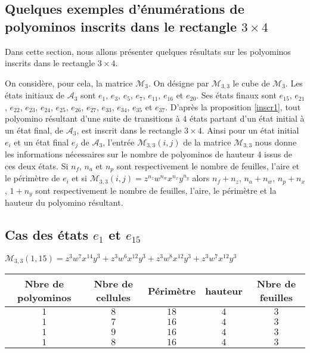 \normalsize
 \begin{spacing}{0.30}
\section*{Quelques exemples d'énumérations de polyominos inscrits dans le rectangle $3 \times 4$ }
 \end{spacing}
Dans  cette section, nous allons présenter quelques résultats sur les polyominos inscrits dans le rectangle $3 \times 4$. 

On considère, pour cela, la matrice $\mathcal{M}_{3}$. On désigne par $\mathcal{M}_{3,3}$ le cube de $\mathcal{M}_{3}$. Les états initiaux de $\mathcal{A}_{3}$ sont $e_{1}$, $e_{3}$, $e_{5}$, $e_{7}$, $e_{11}$, $e_{16}$ et $e_{20}$. Ses états finaux sont $e_{15}$, $e_{21}$, $e_{22}$, $e_{23}$, $e_{24}$, $e_{25}$, $e_{26}$, $e_{27}$, $e_{33}$, $e_{34}$, $e_{35}$ et $e_{37}$. D'après la proposition \ref{inscr1}, tout polyomino résultant d’une suite de transitions à $4$ états partant d’un état initial à un état final, de $\mathcal{A}_{3}$, est inscrit dans le rectangle $3\times 4$. Ainsi pour un état initial $e_{i}$ et un état final $e_{j}$ de $\mathcal{A}_{3}$, l'entrée $\mathcal{M}_{3,3}(i,j)$ de la matrice $\mathcal{M}_{3,3}$ nous donne les informations nécessaires sur le nombre de polyominos de hauteur $4$ issus de ces deux états. Si $n_{f}$, $n_{a}$ et $n_{p}$ sont respectivement le nombre de feuilles, l'aire et le périmètre de $e_{i}$ et si $\mathcal{M}_{3,3}(i,j)=z^{n_{z}}w^{n_{w}}x^{n_{x}}y^{n_{y}}$ alors 
$n_{f} +n_{z}$, $n_{a}+n_{w}$, $n_{p} + n_{x}$, $1+n_{y}$ sont respectivement le nombre de feuilles, l'aire, le périmètre et la hauteur du polyomino résultant.
 \begin{spacing}{0.30}
\subsection*{Cas des états $e_{1}$ et $e_{15}$ }
 \end{spacing}
$\mathcal{M}_{3,3}(1,15)=z^3w^7x^{14}y^3+z^3w^6x^{12}y^3+z^3w^8x^{12}y^3+z^3w^7x^{12}y^3$\\
\begin{tabular}{|c|c|c|c|c|}
 \hline
  Nbre de polyominos & Nbre de cellules & Périmètre & hauteur &Nbre de feuilles\\
 \hline
 $1$ & $8$ & $18$ & $4$ &$3$\\
 \hline
 $1$ & $7$ & $16$ & $4$ &$3$\\
 \hline
  $1$ & $9$ & $16$ & $4$ &$3$\\
 \hline
 $1$ & $8$ & $16$ & $4$ &$3$\\
 \hline
\end{tabular}
